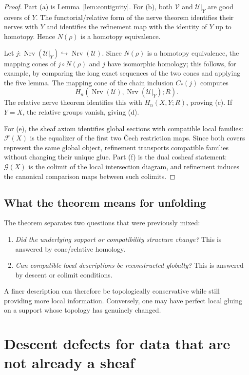 \documentclass[11pt]{article}
\newcommand{\Nrv}{\operatorname{Nrv}}
\begin{document}
\begin{proof}
Part (a) is Lemma~\ref{lem:contiguity}.  For (b), both $\mathcal V$ and $\mathcal U|_Y$ are good covers of $Y$.  The functorial/relative form of the nerve theorem identifies their nerves with $Y$ and identifies the refinement map with the identity of $Y$ up to homotopy.  Hence $N(\rho)$ is a homotopy equivalence.

Let $j:\Nrv(\mathcal U|_Y)\hookrightarrow\Nrv(\mathcal U)$.  Since $N(\rho)$ is a homotopy equivalence, the mapping cones of $j\circ N(\rho)$ and $j$ have isomorphic homology; this follows, for example, by comparing the long exact sequences of the two cones and applying the five lemma.  The mapping cone of the chain inclusion $C_*(j)$ computes
\[
H_n(\Nrv(\mathcal U),\Nrv(\mathcal U|_Y);R).
\]
The relative nerve theorem identifies this with $H_n(X,Y;R)$, proving (c).  If $Y=X$, the relative groups vanish, giving (d).

For (e), the sheaf axiom identifies global sections with compatible local families: $\mathcal F(X)$ is the equalizer of the first two \v{C}ech restriction maps.  Since both covers represent the same global object, refinement transports compatible families without changing their unique glue.  Part (f) is the dual cosheaf statement: $\mathcal G(X)$ is the colimit of the local intersection diagram, and refinement induces the canonical comparison maps between such colimits.
\end{proof}

\subsection{What the theorem means for unfolding}
The theorem separates two questions that were previously mixed:
\begin{enumerate}[label=(\roman*)]
\item \emph{Did the underlying support or compatibility structure change?}  This is answered by cone/relative homology.
\item \emph{Can compatible local descriptions be reconstructed globally?}  This is answered by descent or colimit conditions.
\end{enumerate}
A finer description can therefore be topologically conservative while still providing more local information.  Conversely, one may have perfect local gluing on a support whose topology has genuinely changed.

\section{Descent defects for data that are not already a sheaf}
\end{document}
